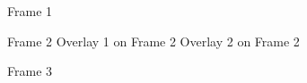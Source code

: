 \documentclass{beamer}
\begin{document}
\begin{frame}{Frame 1}
\end{frame}
\begin{frame}[label=frame2]{Frame 2}
  Overlay 1 on Frame 2
  \pause %
  Overlay 2 on Frame 2
\end{frame}
\begin{frame}{Frame 3}
\end{frame}
\end{document}
